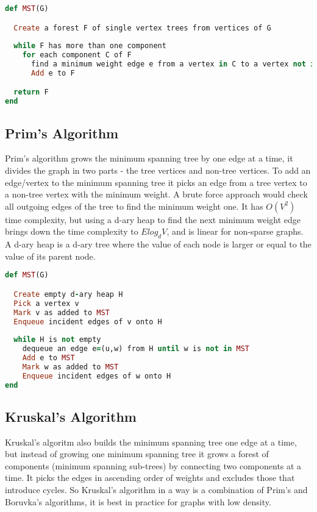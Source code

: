 \documentclass{report}
\theoremstyle{plain}
\theoremstyle{definition}
\theoremstyle{remark}
\begin{document}
\begin{lstlisting}[language=Ruby, mathescape]
def MST(G)

  Create a forest F of single vertex trees from vertices of G
  
  while F has more than one component
    for each component C of F
      find a minimum weight edge e from a vertex in C to a vertex not in C
      Add e to F

  return F
end
\end{lstlisting}

\subsection*{Prim's Algorithm}
Prim's algorithm grows the minimum spanning tree by one edge at a time, it divides the graph in two parts - the tree vertices and non-tree vertices. To add an edge/vertex to the minimum spanning tree it picks an edge from a tree vertex to a non-tree vertex with the minimum weight. A brute force approach would check all outgoing edges of the tree to find the minimum weight one. It has $O(V^2)$ time complexity, but using a d-ary heap to find the next minimum weight edge brings down the time complexity to $Elog_dV$, and is linear for non-sparse graphs. A d-ary heap is a d-ary tree where the value of each node is larger or equal to the value of its parent node.

\begin{lstlisting}[language=Ruby]
def MST(G)

  Create empty d-ary heap H
  Pick a vertex v
  Mark v as added to MST
  Enqueue incident edges of v onto H
  
  while H is not empty
    dequeue an edge e=(u,w) from H until w is not in MST
    Add e to MST
    Mark w as added to MST
    Enqueue incident edges of w onto H
end
\end{lstlisting}

\subsection*{Kruskal's Algorithm}
Kruskal's algoritm also builds the minimum spanning tree one edge at a time, but instead of growing one minimum spanning tree it grows a forest of components (minimum spanning sub-trees) by connecting two components at a time. It picks the edges in ascending order of weights and excludes those that introduce cycles. So Kruskal's algorithm in a way is a combination of Prim's and Boruvka's algorithms, it is best in practice for graphs with low density.
\end{document}
